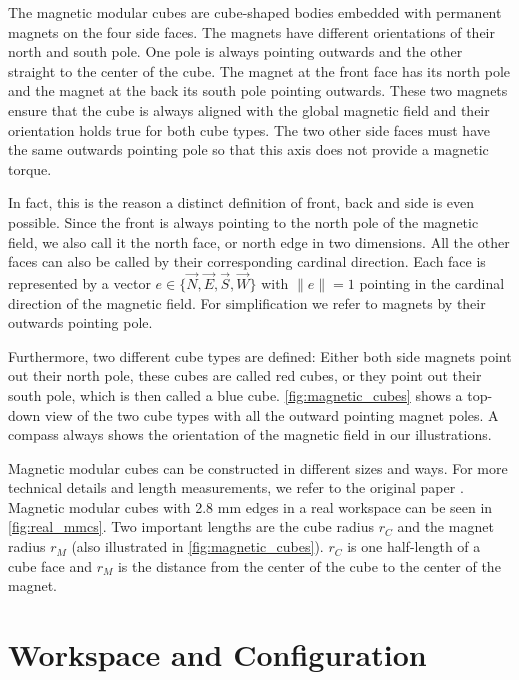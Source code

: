 The magnetic modular cubes are cube-shaped bodies embedded with permanent magnets on the four side faces.
The magnets have different orientations of their north and south pole. 
One pole is always pointing outwards and the other straight to the center of the cube.
The magnet at the front face has its north pole and the magnet at the back its south pole pointing outwards.
These two magnets ensure that the cube is always aligned with the global magnetic field and their orientation holds true for both cube types.
The two other side faces must have the same outwards pointing pole so that this axis does not provide a magnetic torque.

In fact, this is the reason a distinct definition of front, back and side is even possible.
Since the front is always pointing to the north pole of the magnetic field, we also call it the north face, or north edge in two dimensions.
All the other faces can also be called by their corresponding cardinal direction.
Each face is represented by a vector $e \in \{ \vec{N},\vec{E},\vec{S},\vec{W}\}$ with $\lVert e \rVert = 1$ pointing in the cardinal direction of the magnetic field.
For simplification we refer to magnets by their outwards pointing pole.

Furthermore, two different cube types are defined:
Either both side magnets point out their north pole, these cubes are called red cubes, or they point out their south pole, which is then called a blue cube.
\autoref{fig:magnetic_cubes} shows a top-down view of the two cube types with all the outward pointing magnet poles.
A compass always shows the orientation of the magnetic field in our illustrations.

Magnetic modular cubes can be constructed in different sizes and ways. For more technical details and length measurements, we refer to the original paper \cite{Bhattacharjee2022}.
Magnetic modular cubes with 2.8 mm edges in a real workspace can be seen in \autoref{fig:real_mmcs}.
Two important lengths are the cube radius $r_C$ and the magnet radius $r_M$ (also illustrated in \autoref{fig:magnetic_cubes}).
$r_C$ is one half-length of a cube face and $r_M$ is the distance from the center of the cube to the center of the magnet.



\section{Workspace and Configuration}
\label{sec:workspace}

